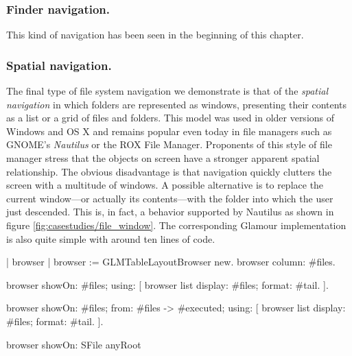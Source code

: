 \documentclass[a4paper,10pt,twoside]{book}
\begin{document}
\subsubsection{Finder navigation.} This kind of navigation has been
seen in the beginning of this chapter.

\subsubsection{Spatial navigation.} The final type of file system
navigation we demonstrate is that of the \emph{spatial navigation} in
which folders are represented as windows, presenting their contents as
a list or a grid of files and folders. This model was used in older
versions of Windows and OS X and remains popular even today in file
managers such as GNOME's \emph{Nautilus} or the ROX File
Manager. Proponents of this style of file manager stress that the
objects on screen have a stronger apparent spatial relationship. The
obvious disadvantage is that navigation quickly clutters the screen
with a multitude of windows. A possible alternative is to replace the
current window---or actually its contents---with the folder into which
the user just descended. This is, in fact, a behavior supported by
Nautilus as shown in figure \ref{fig:casestudies/file_window}. The
corresponding Glamour implementation is also quite simple with around
ten lines of code. 

\begin{code}{}
| browser |
browser := GLMTableLayoutBrowser new.
browser column: #files.

browser showOn: #files; using: [
	browser list
		display: #files;
		format: #tail.
].

browser showOn: #files; from: #files -> #executed; using: [
	browser list
		display: #files;
		format: #tail.
].

browser showOn: SFile anyRoot
\end{code}
\end{document}
